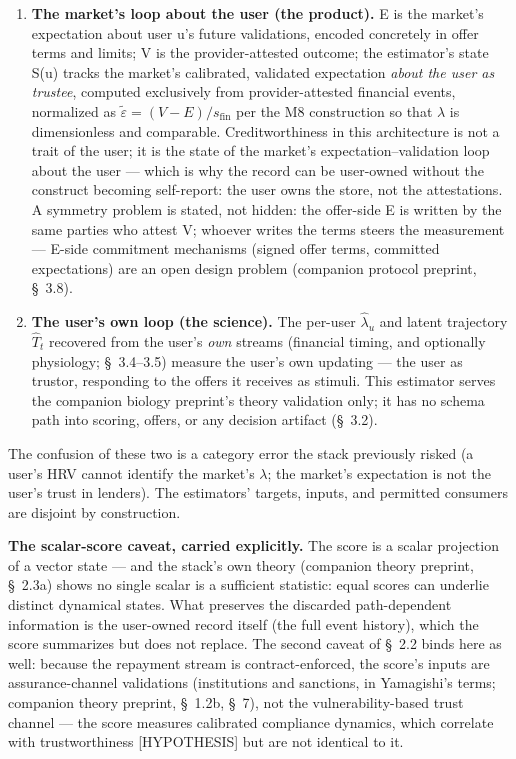 \documentclass[11pt,twocolumn]{article}
\begin{document}
\begin{enumerate}
\item \textbf{The market's loop about the user (the product).} E is the market's expectation about user u's future validations, encoded concretely in offer terms and limits; V is the provider-attested outcome; the estimator's state S(u) tracks the market's calibrated, validated expectation \emph{about the user as trustee}, computed exclusively from provider-attested financial events, normalized as $\tilde{\varepsilon} = (V - E)/s_{\mathrm{fin}}$ per the M8 construction so that $\lambda$ is dimensionless and comparable. Creditworthiness in this architecture is not a trait of the user; it is the state of the market's expectation--validation loop about the user --- which is why the record can be user-owned without the construct becoming self-report: the user owns the store, not the attestations. A symmetry problem is stated, not hidden: the offer-side E is written by the same parties who attest V; whoever writes the terms steers the measurement --- E-side commitment mechanisms (signed offer terms, committed expectations) are an open design problem (companion protocol preprint, \S~3.8).
\item \textbf{The user's own loop (the science).} The per-user $\hat{\lambda}_u$ and latent trajectory $\hat{T}_t$ recovered from the user's \emph{own} streams (financial timing, and optionally physiology; \S~3.4--3.5) measure the user's own updating --- the user as trustor, responding to the offers it receives as stimuli. This estimator serves the companion biology preprint's theory validation only; it has no schema path into scoring, offers, or any decision artifact (\S~3.2).
\end{enumerate}

The confusion of these two is a category error the stack previously risked (a user's HRV cannot identify the market's $\lambda$; the market's expectation is not the user's trust in lenders). The estimators' targets, inputs, and permitted consumers are disjoint by construction.

\textbf{The scalar-score caveat, carried explicitly.} The score is a scalar projection of a vector state --- and the stack's own theory (companion theory preprint, \S~2.3a) shows no single scalar is a sufficient statistic: equal scores can underlie distinct dynamical states. What preserves the discarded path-dependent information is the user-owned record itself (the full event history), which the score summarizes but does not replace. The second caveat of \S~2.2 binds here as well: because the repayment stream is contract-enforced, the score's inputs are assurance-channel validations (institutions and sanctions, in Yamagishi's terms; companion theory preprint, \S~1.2b, \S~7), not the vulnerability-based trust channel --- the score measures calibrated compliance dynamics, which correlate with trustworthiness [HYPOTHESIS] but are not identical to it.
\end{document}
